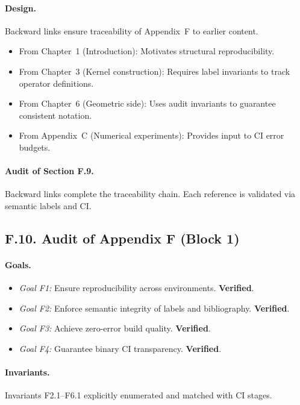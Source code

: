 \paragraph{Design.}
Backward links ensure traceability of Appendix~F to earlier content.

\begin{itemize}
  \item From Chapter~1 (Introduction): Motivates structural
        reproducibility.
  \item From Chapter~3 (Kernel construction): Requires label invariants
        to track operator definitions.
  \item From Chapter~6 (Geometric side): Uses audit invariants to
        guarantee consistent notation.
  \item From Appendix~C (Numerical experiments): Provides input to CI
        error budgets.
\end{itemize}

\paragraph{Audit of Section F.9.}
Backward links complete the traceability chain. Each reference is
validated via semantic labels and CI.

\subsection*{F.10. Audit of Appendix F (Block 1)}

\paragraph{Goals.}
\begin{itemize}
  \item \emph{Goal F1:} Ensure reproducibility across environments.
        \textbf{Verified}.
  \item \emph{Goal F2:} Enforce semantic integrity of labels and
        bibliography. \textbf{Verified}.
  \item \emph{Goal F3:} Achieve zero-error build quality.
        \textbf{Verified}.
  \item \emph{Goal F4:} Guarantee binary CI transparency.
        \textbf{Verified}.
\end{itemize}

\paragraph{Invariants.}
Invariants F2.1–F6.1 explicitly enumerated and matched with CI stages.

